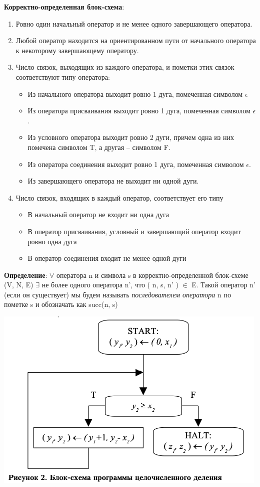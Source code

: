 \textbf{Корректно-определенная блок-схема}:
\begin{enumerate}
    \item Ровно один начальный оператор и не менее одного завершающего оператора.
    \item Любой оператор находится на ориентированном пути от начального оператора к некоторому завершающему оператору.
    \item Число связок, выходящих из каждого оператора, и пометки этих связок соответствуют типу оператора: 
    \begin{itemize}
        \item Из начального оператора выходит ровно 1 дуга, помеченная символом $\epsilon$
        \item Из оператора присваивания выходит ровно 1 дуга, помеченная символом $\epsilon$.
        \item Из условного оператора выходит ровно 2 дуги, причем одна из них помечена символом T, а другая – символом F.
        \item Из оператора соединения выходит ровно 1 дуга, помеченная символом $\epsilon$.
        \item Из завершающего оператора не выходит ни одной дуги.
    \end{itemize}
    \item Число связок, входящих в каждый оператор, соответствует его типу
    \begin{itemize}
        \item В начальный оператор не входит ни одна дуга
        \item В оператор присваивания, условный и завершающий оператор входит ровно одна дуга
        \item В оператор соединения входит не менее одной дуги
    \end{itemize}
\end{enumerate}

\textbf{Определение}: $\forall$ оператора n и символа s в корректно-определенной блок-схеме (V, N, E) $\exists$ не более одного оператора n', что ( n, s, n' ) $\in$ E. Такой оператор n' (если он существует) мы будем называть \textit{последователем оператора} n по пометке s и обозначать как succ(n, s)

\includegraphics[scale=0.5]{pics/block_scheme.png}

